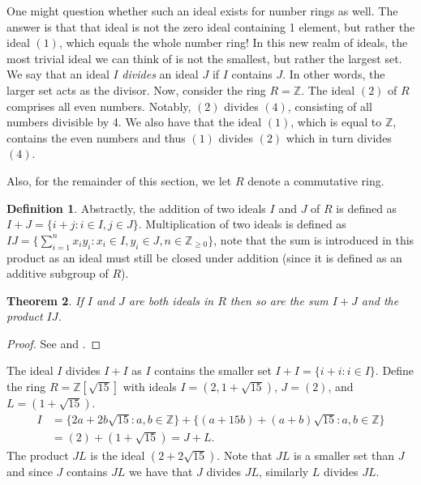 \documentclass[openany, a4paper, 10pt]{book}
\theoremstyle{plain}
\newtheorem{theorem}{Theorem}[chapter]
\theoremstyle{plain}
\theoremstyle{plain}
\theoremstyle{definition}
\newtheorem{definition}[theorem]{Definition}
\theoremstyle{plain}
\theoremstyle{definition}
\theoremstyle{remark}
\begin{document}
One might question whether such an ideal exists for number rings as well.
The answer is that that ideal is not the zero ideal containing 1 element, but rather the ideal $(1)$, which equals the whole number ring!
In this new realm of ideals, the most trivial ideal we can think of is not the smallest, but rather the largest set.
We say that an ideal $I$ \textit{divides} an ideal $J$ if $I$ contains $J$.
In other words, the larger set acts as the divisor.
Now, consider the ring $R = \mathbb Z$.
The ideal $(2)$ of $R$ comprises all even numbers.
Notably, $(2)$ divides $(4)$, consisting of all numbers divisible by 4.
We also have that the ideal $(1)$, which is equal to $\mathbb Z$, contains the even numbers and thus $(1)$ divides $(2)$ which in turn divides $(4)$.

Also, for the remainder of this section, we let $R$ denote a commutative ring.

\begin{definition}
    Abstractly, the addition of two ideals $I$ and $J$ of $R$ is defined as $I+J = \{ i+j: i\in I, j\in J\}$.
    Multiplication of two ideals is defined as $IJ = \{ \sum_{i=1}^n x_i y_i: x_i \in I, y_i \in J, n\in \mathbb Z_{\geq 0} \}$, note that the sum is introduced in this product as an ideal must still be closed under addition (since it is defined as an additive subgroup of $R$).
\end{definition}
\begin{theorem}
    If $I$ and $J$ are both ideals in $R$ then so are the sum $I+J$ and the product $IJ$.
\end{theorem}
\begin{proof}
    See \cite[Lemma~2.3]{rings_proof} and \cite[Prop.~2.4]{ANT_dictaat}.
\end{proof}
\begin{examplebox}
    The ideal $I$ divides $I+I$ as $I$ contains the smaller set $I+I = \{i+i: i\in I\}$.
    \tcbline
    Define the ring $R=\mathbb Z[\sqrt{15}]$ with ideals $I=(2,1+\sqrt{15})$, $J=(2)$, and $L = (1+\sqrt{15})$.
    \begin{align*}
        I &= \{ 2a+2b\sqrt{15}: a,b \in \mathbb Z \} + \{ (a+15b) + (a+b)\sqrt{15}: a,b \in \mathbb Z \} \\
          &= (2) + (1+\sqrt{15}) = J + L.
    \end{align*}
    The product $JL$ is the ideal $(2+2\sqrt{15})$.
    Note that $JL$ is a smaller set than $J$ and since $J$ contains $JL$ we have that $J$ divides $JL$, similarly $L$ divides $JL$.
\end{examplebox}
\end{document}
